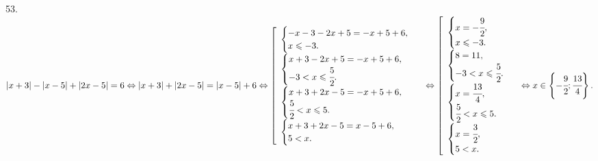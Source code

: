 \documentclass[12pt]{article}
\begin{document}
53. $|x+3|-|x-5|+|2x-5|=6\Leftrightarrow |x+3|+|2x-5|=|x-5|+6\Leftrightarrow \left[\begin{array}{l}\begin{cases} -x-3-2x+5=-x+5+6,\\ x\leqslant-3.\end{cases}\\
\begin{cases} x+3-2x+5=-x+5+6,\\ -3<x\leqslant\cfrac{5}{2}.\end{cases}\\ \begin{cases} x+3+2x-5=-x+5+6,\\ \cfrac{5}{2}<x\leqslant5.\end{cases}\\
\begin{cases} x+3+2x-5=x-5+6,\\ 5< x.\end{cases}\end{array}\right.\Leftrightarrow \left[\begin{array}{l}\begin{cases} x=-\cfrac{9}{2},\\ x\leqslant-3.\end{cases}\\
\begin{cases} 8=11,\\ -3<x\leqslant\cfrac{5}{2}.\end{cases}\\ \begin{cases} x=\cfrac{13}{4},\\ \cfrac{5}{2}<x\leqslant5.\end{cases}\\
\begin{cases} x=\cfrac{3}{2},\\ 5< x.\end{cases}\end{array}\right.\Leftrightarrow x\in\left\{-\cfrac{9}{2};\cfrac{13}{4}\right\}.$\\
\end{document}
